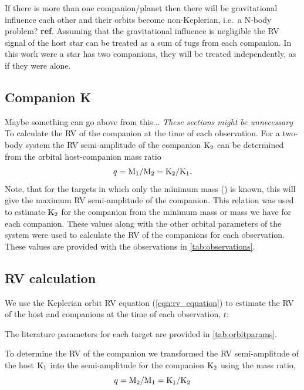 

If there is more than one companion/planet then there will be gravitational influence each other and their orbits become non-Keplerian, i.e.\ a N-body problem? {\textbf{ref}}. Assuming that the gravitational influence is negligible the RV signal of the host star can be treated as a sum of tugs from each companion.
In this work were a star has two companions, they will be treated independently, as if they were alone.



\subsection{Companion K}  Maybe something can go above from this...
\label{sec:companion_RV}
\emph{These sections might be unnecessary}\\

To calculate the {RV} of the companion at the time of each observation.
For a two-body system the {RV} semi-amplitude of the companion \(\textrm{K}_{2}\) can be determined from the orbital host-companion mass ratio
\begin{equation}
q = \textrm{M}_{1}/\textrm{M}_{2} = \textrm{K}_{2}/\textrm{K}_{1}\label{eqn:q_ratio_K2}.
\end{equation}
Note, that for the targets in which only the minimum mass (\Mtwosini) is known, this will give the maximum {RV} semi-amplitude of the companion.
This relation was used to estimate \(\textrm{K}_{2}\) for the companion from the minimum mass or mass we have for each companion.
These values along with the other orbital parameters of the system were used to calculate the {RV} of the companions for each observation.
These values are provided with the observations in \cref{tab:observations}.




\subsection{{RV} calculation}
We use the Keplerian orbit {RV} equation (\cref{eqn:rv_equation}) to estimate the {RV} of the host and companions at the time of each observation, \(t\):

The literature parameters for each target are provided in \cref{tab:orbitparams}.


To determine the {RV} of the companion we transformed the {RV} semi-amplitude of the host \(\textrm{K}_{1}\) into the semi-amplitude for the companion \(\textrm{K}_{2}\) using the mass ratio,
\begin{equation}
\label{eqn:mass_ratio}
q = \textrm{M}_{2} / \textrm{M}_{1} = \textrm{K}_{1} / \textrm{K}_{2}
\end{equation}

